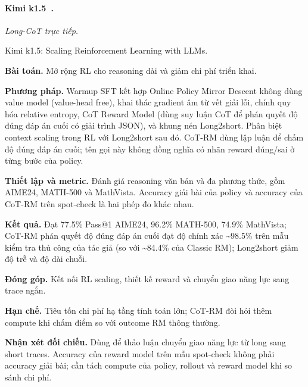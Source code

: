 \begin{samepage}
\paragraph{Kimi k1.5~\cite{rra1_kimi_k15}.}
\emph{Long-CoT trực tiếp.}\par
{\raggedright\noindent\small Kimi k1.5: Scaling Reinforcement Learning with LLMs.\par}
\noindent\textbf{Bài toán.} Mở rộng RL cho reasoning dài và giảm chi phí triển khai.\par
\end{samepage}
\noindent\textbf{Phương pháp.} Warmup SFT kết hợp Online Policy Mirror Descent không dùng value model (value-head free), khai thác gradient âm từ vết giải lỗi, chính quy hóa relative entropy, CoT Reward Model (dùng suy luận CoT để phán quyết độ đúng đáp án cuối có giải trình JSON), và khung nén Long2short. Phân biệt context scaling trong RL với Long2short sau đó. CoT-RM dùng lập luận để chấm độ đúng đáp án cuối; tên gọi này không đồng nghĩa có nhãn reward đúng/sai ở từng bước của policy.\par
\noindent\textbf{Thiết lập và metric.} Đánh giá reasoning văn bản và đa phương thức, gồm AIME24, MATH-500 và MathVista. Accuracy giải bài của policy và accuracy của CoT-RM trên spot-check là hai phép đo khác nhau.\par
\noindent\textbf{Kết quả.} Đạt 77.5\% Pass@1 AIME24, 96.2\% MATH-500, 74.9\% MathVista; CoT-RM phán quyết độ đúng đáp án cuối đạt độ chính xác \textasciitilde{}98.5\% trên mẫu kiểm tra thủ công của tác giả (so với \textasciitilde{}84.4\% của Classic RM); Long2short giảm độ trễ và độ dài chuỗi.\par
\noindent\textbf{Đóng góp.} Kết nối RL scaling, thiết kế reward và chuyển giao năng lực sang trace ngắn.\par
\noindent\textbf{Hạn chế.} Tiêu tốn chi phí hạ tầng tính toán lớn; CoT-RM đòi hỏi thêm compute khi chấm điểm so với outcome RM thông thường.\par
\begin{samepage}
\noindent\textbf{Nhận xét đối chiếu.} Dùng để thảo luận chuyển giao năng lực từ long sang short traces. Accuracy của reward model trên mẫu spot-check không phải accuracy giải bài; cần tách compute của policy, rollout và reward model khi so sánh chi phí.\par
{}
\end{samepage}

